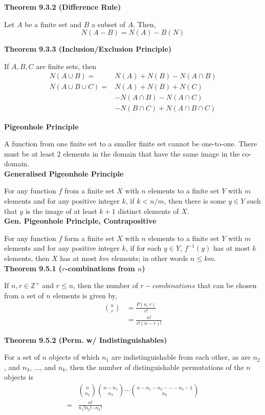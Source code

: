 \documentclass[a4paper]{article}
\newcommand{\subheading}[1]{{\scriptsize\textbf{#1}}}
\begin{document}
\begin{multicols*}{4}
\subheading{Theorem 9.3.2 (Difference Rule)}

Let $A$ be a finite set and $B$ a subset of $A$. Then,
$$N(A-B) = N(A) - B(N)$$

\subheading{Theorem 9.3.3 (Inclusion/Exclusion Principle)}

If $A, B, C$ are finite sets, then
\begin{align*}
  N(A \cup B) = &N(A) + N(B) - N(A \cap B) \\
  N(A \cup B \cup C) = &N(A) + N(B) + N(C) \\
    &-N(A \cap B) - N(A \cap C)\\
    &- N(B \cap C)+ N(A \cap B \cap C)
\end{align*}

\subheading{Pigeonhole Principle}

A function from one finite set to a smaller finite set cannot be one-to-one.
There must be at least 2 elements in the domain that have the same image in the
co-domain.\\

\subheading{Generalised Pigeonhole Principle}

For any function $f$ from a finite set $X$ with $n$ elements to a finite set $Y$
with $m$ elements and for any positive integer $k$, if $k < n/m$, then there is
some $y \in Y$ such that $y$ is the image of at least $k + 1$ distinct elements
of $X$.\\

\subheading{Gen. Pigeonhole Principle, Contrapositive}

For any function $f$ form a finite set $X$ with $n$ elements to a finite set $Y$
with $m$ elements and for any positive integer $k$, if for each $y \in Y$,
$f^{-1}(y)$ has at most $k$ elements, then $X$ has at most $km$ elements; in
other words $n \leq km$.\\

\subheading{Theorem 9.5.1 ($r$-combinations from $n$)}

If $n, r \in \mathbb{Z}^+$ and $r \leq n$, then the number of $r-combinations$
that can be chosen from a set of $n$ elements is given by,
\begin{align*}
  \binom{n}{r} &= \frac{P(n, r)}{r!} \\
    &= \frac{n!}{r!(n-r)!}
\end{align*}

\subheading{Theorem 9.5.2 (Perm. w/ Indistinguishables)}

For a set of $n$ objects of which $n_1$ are indistinguishable from each other,
as are $n_2$, and $n_3$, ..., and $n_k$, then the number of distinguishable
permutations of the $n$ objects is
\begin{align*}
  &\binom{n}{n_1} \binom{n-n_1}{n_2} \cdots \binom{n-n_1-n_2- \cdots - n_k-1}{n_k} \\
  = &\frac{n!}{n_1!n_2!\cdots n_k!}
\end{align*}


\end{multicols*}
\end{document}
